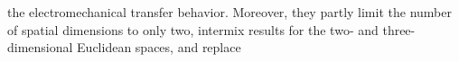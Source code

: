 the electromechanical transfer behavior.
Moreover,
they partly limit
the number of
spatial dimensions to
only two, intermix
results for
the two- and
three-dimensional Euclidean spaces, and replace
